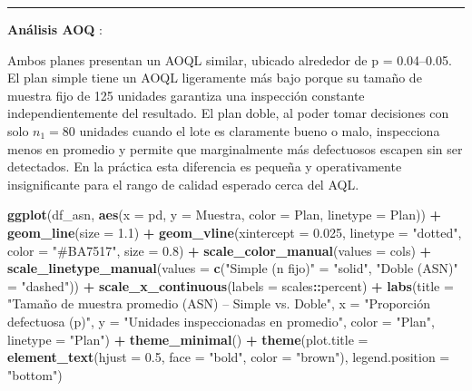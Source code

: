 \documentclass[
  12pt,
]{article}
\newenvironment{Shaded}{\begin{snugshade}}{\end{snugshade}}
\newcommand{\AttributeTok}[1]{\textcolor[rgb]{0.13,0.29,0.53}{#1}}
\newcommand{\FloatTok}[1]{\textcolor[rgb]{0.00,0.00,0.81}{#1}}
\newcommand{\FunctionTok}[1]{\textcolor[rgb]{0.13,0.29,0.53}{\textbf{#1}}}
\newcommand{\NormalTok}[1]{#1}
\newcommand{\OtherTok}[1]{\textcolor[rgb]{0.56,0.35,0.01}{#1}}
\newcommand{\SpecialCharTok}[1]{\textcolor[rgb]{0.81,0.36,0.00}{\textbf{#1}}}
\newcommand{\StringTok}[1]{\textcolor[rgb]{0.31,0.60,0.02}{#1}}
\begin{document}
\begin{center}\rule{0.5\linewidth}{0.5pt}\end{center}

\textbf{Análisis AOQ} :

Ambos planes presentan un AOQL similar, ubicado alrededor de p =
0.04--0.05. El plan simple tiene un AOQL ligeramente más bajo porque su
tamaño de muestra fijo de 125 unidades garantiza una inspección
constante independientemente del resultado. El plan doble, al poder
tomar decisiones con solo \(n_1 = 80\) unidades cuando el lote es
claramente bueno o malo, inspecciona menos en promedio y permite que
marginalmente más defectuosos escapen sin ser detectados. En la práctica
esta diferencia es pequeña y operativamente insignificante para el rango
de calidad esperado cerca del AQL.

\begin{Shaded}
\begin{Highlighting}[]
\FunctionTok{ggplot}\NormalTok{(df\_asn, }\FunctionTok{aes}\NormalTok{(}\AttributeTok{x =}\NormalTok{ pd, }\AttributeTok{y =}\NormalTok{ Muestra, }\AttributeTok{color =}\NormalTok{ Plan, }\AttributeTok{linetype =}\NormalTok{ Plan)) }\SpecialCharTok{+}
  \FunctionTok{geom\_line}\NormalTok{(}\AttributeTok{size =} \FloatTok{1.1}\NormalTok{) }\SpecialCharTok{+}
  \FunctionTok{geom\_vline}\NormalTok{(}\AttributeTok{xintercept =} \FloatTok{0.025}\NormalTok{, }\AttributeTok{linetype =} \StringTok{"dotted"}\NormalTok{,}
             \AttributeTok{color =} \StringTok{"\#BA7517"}\NormalTok{, }\AttributeTok{size =} \FloatTok{0.8}\NormalTok{) }\SpecialCharTok{+}
  \FunctionTok{scale\_color\_manual}\NormalTok{(}\AttributeTok{values =}\NormalTok{ cols) }\SpecialCharTok{+}
  \FunctionTok{scale\_linetype\_manual}\NormalTok{(}\AttributeTok{values =} \FunctionTok{c}\NormalTok{(}\StringTok{"Simple (n fijo)"} \OtherTok{=} \StringTok{"solid"}\NormalTok{,}
                                   \StringTok{"Doble (ASN)"}     \OtherTok{=} \StringTok{"dashed"}\NormalTok{)) }\SpecialCharTok{+}
  \FunctionTok{scale\_x\_continuous}\NormalTok{(}\AttributeTok{labels =}\NormalTok{ scales}\SpecialCharTok{::}\NormalTok{percent) }\SpecialCharTok{+}
  \FunctionTok{labs}\NormalTok{(}\AttributeTok{title =} \StringTok{"Tamaño de muestra promedio (ASN) – Simple vs. Doble"}\NormalTok{,}
       \AttributeTok{x =} \StringTok{"Proporción defectuosa (p)"}\NormalTok{,}
       \AttributeTok{y =} \StringTok{"Unidades inspeccionadas en promedio"}\NormalTok{,}
       \AttributeTok{color =} \StringTok{"Plan"}\NormalTok{, }\AttributeTok{linetype =} \StringTok{"Plan"}\NormalTok{) }\SpecialCharTok{+}
  \FunctionTok{theme\_minimal}\NormalTok{() }\SpecialCharTok{+}
  \FunctionTok{theme}\NormalTok{(}\AttributeTok{plot.title =} \FunctionTok{element\_text}\NormalTok{(}\AttributeTok{hjust =} \FloatTok{0.5}\NormalTok{, }\AttributeTok{face =} \StringTok{"bold"}\NormalTok{, }\AttributeTok{color =} \StringTok{"brown"}\NormalTok{),}
        \AttributeTok{legend.position =} \StringTok{"bottom"}\NormalTok{)}
\end{Highlighting}
\end{Shaded}
\end{document}
